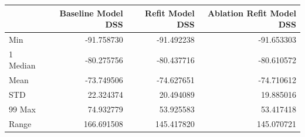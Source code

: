 \begin{tabular}{lrrr}
\toprule
 & Baseline Model DSS & Refit Model DSS & Ablation Refit Model DSS \\
\midrule
Min & -91.758730 & -91.492238 & -91.653303 \\
1%
Median & -80.275756 & -80.437716 & -80.610572 \\
Mean & -73.749506 & -74.627651 & -74.710612 \\
STD & 22.324374 & 20.494089 & 19.885016 \\
99%
Max & 74.932779 & 53.925583 & 53.417418 \\
Range & 166.691508 & 145.417820 & 145.070721 \\
\bottomrule
\end{tabular}
